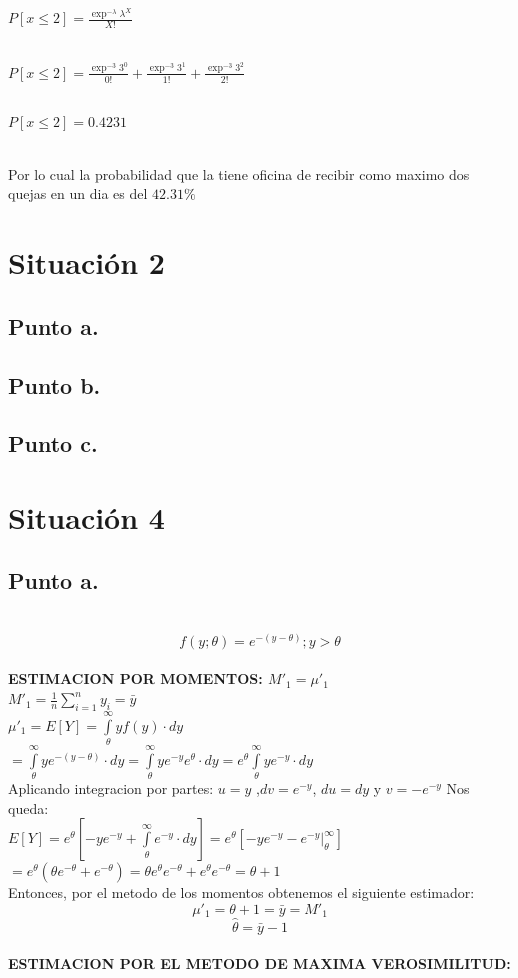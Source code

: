 \documentclass[letterpaper,12pt,onecolumn,titlepage]{article}
\begin{document}
~\\ $P[x\le2]= \frac{\exp^{-\lambda}\lambda^{X}}{X!}$

~\\ $P[x\le2]= \frac{\exp^{-3}3^{0}}{0!} + 
			 \frac{\exp^{-3}3^{1}}{1!} + 
			 \frac{\exp^{-3}3^{2}}{2!}$
			 
~\\ $P[x\le2]= 0.4231 $

~\\ Por lo cual la probabilidad que la tiene oficina de recibir como maximo dos quejas en un dia es del {$42.31\%$}

\pagebreak\section{Situaci\'{o}n 2}
\subsection{Punto a.}
\subsection{Punto b.} 
\subsection{Punto c.} 

\pagebreak\section{Situaci\'{o}n 4}
\subsection{Punto a.}
~\\ $$f(y;\theta)=e^{-(y-\theta)};  y>\theta$$  
~\\ \textbf{ESTIMACION POR MOMENTOS: $M'_1=\mu'_1$}
~\\ $M'_1=\frac{1}{n}\sum_{i=1}^{n}{y_{i}}=\bar{y}$
~\\ $\mu'_1=E[Y]=\int \limits_{\theta}^{\infty} y f(y) \cdot dy$
~\\ $=\int \limits_{\theta}^{\infty} ye^{-(y-\theta)} \cdot dy=\int \limits_{\theta}^{\infty} ye^{-y}e^\theta \cdot dy=e^\theta\int \limits_{\theta}^{\infty}ye^{-y} \cdot dy$
~\\ Aplicando integracion por partes: $u=y$ ,$dv=e^{-y}$, $du=dy$ y $v=-e^{-y}$ Nos queda:
~\\ $E[Y]=e^{\theta}[-ye^{-y}+\int \limits_{\theta}^{\infty}e^{-y} \cdot dy] =e^{\theta}[-ye^{-y}- e^{-y}|_{\theta}^{\infty}] $
~\\ $=e^{\theta}(\theta e^{-\theta}+e^{-\theta})=\theta e^{\theta}e^{-\theta}+e^{\theta}e^{-\theta}= \theta + 1 $ 
~\\ Entonces, por el metodo de los momentos obtenemos el siguiente estimador:
~\\ $$\mu'_1=\theta + 1= \bar{y} = M'_1$$
 $$\hat{\theta}=\bar{y}-1$$
~\\ \textbf{ESTIMACION POR EL METODO DE MAXIMA VEROSIMILITUD:}
~\\
\end{document}
